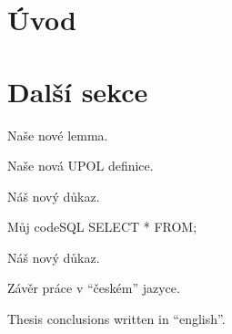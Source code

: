\documentclass[a4paper,12pt]{article}
\begin{document}
\maketitle

\upthanksanot

\uptocandlists

\section{Úvod}

\section{Další sekce}

\begin{uplemma}
Naše nové lemma.
\end{uplemma}


\begin{uptheorem}
Naše nová \gls{UPOL} definice.
\end{uptheorem}

\begin{upproof}
Náš nový důkaz.
\end{upproof}

\begin{upcode}{Můj code}{}{SQL}
SELECT * FROM;
\end{upcode}


\begin{upquote}
Náš nový důkaz. 
\end{upquote}

\upendofmainmatter

\begin{upconclusions}[czech]
Závěr práce v \enquote{českém} jazyce.
\end{upconclusions}

\begin{upconclusions}[english]
Thesis conclusions written in \enquote{english}.
\end{upconclusions}

\nocite{*}							%
\printbibliography
\end{document}
